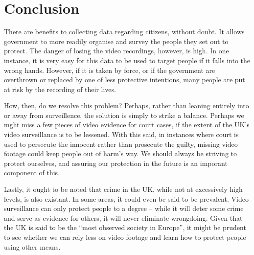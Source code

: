 \documentclass[10pt, draft]{article}
\begin{document}
\section{Conclusion}\par
There are benefits to collecting data regarding citizens, without doubt. It allows government to more readily organise and survey the people they set out to protect. The danger of losing the video recordings, however, is high. In one instance, it is very easy for this data to be used to target people if it falls into the wrong hands. However, if it is taken by force, or if the government are overthrown or replaced by one of less protective intentions, many people are put at risk by the recording of their lives. \par
How, then, do we resolve this problem? Perhaps, rather than leaning entirely into or away from surveillence, the solution is simply to strike a balance. Perhaps we mght miss a few pieces of video evidence for court cases, if the extent of the UK's video surveillance is to be lessened. With this said, in instances where court is used to persecute the innocent rather than prosecute the guilty, missing video footage could keep people out of harm's way. We should always be striving to protect ourselves, and assuring our protection in the future is an imporant component of this. \par
Lastly, it ought to be noted that crime in the UK, while not at excessively high levels, is also existant. In some areas, it could even be said to be prevalent. Video surveillance can only protect people to a degree -- while it will deter some crime and serve as evidence for others, it will never eliminate wrongdoing. Given that the UK is said to be the ``most observed society in Europe'', it might be prudent to see whether we can rely less on video footage and learn how to protect people using other means. 

\end{document}
